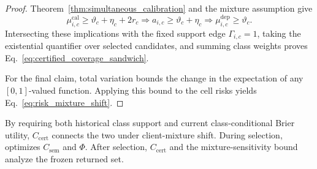 \begin{proof}
Theorem~\ref{thm:simultaneous_calibration} and the mixture assumption give
\[
\mu_{i,c}^{\mathrm{cal}}\ge\vartheta_c+\eta_c+2r_c
\Longrightarrow a_{i,c}\ge\vartheta_c+\eta_c
\Longrightarrow\mu_{i,c}^{\mathrm{dep}}\ge\vartheta_c.
\]
Intersecting these implications with the fixed support edge
$\Gamma_{i,c}=1$, taking the existential quantifier over selected
candidates, and summing class weights proves
Eq.~\ref{eq:certified_coverage_sandwich}.

For the final claim, total variation bounds the change in the expectation of
any $[0,1]$-valued function. Applying this bound to the cell risks yields
Eq.~\ref{eq:risk_mixture_shift}.
\end{proof}

By requiring both historical class support and current class-conditional Brier
utility, $C_{\mathrm{cert}}$ connects the two under client-mixture shift.
During selection, \Fname optimizes $C_{\mathrm{sem}}$ and $\Phi$. After
selection, $C_{\mathrm{cert}}$ and the mixture-sensitivity bound analyze the
frozen returned set.

\endgroup
